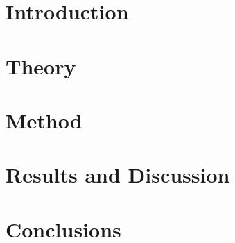 \mainmatter

\chapter{Introduction}
\label{cha:introduction}


\vspace{\fill}

\newpage

\chapter{Theory}
\label{cha:theory}


\vspace{\fill}

\newpage

\chapter{Method}
\label{cha:method}


\vspace{\fill}

\newpage

\chapter{Results and Discussion}
\label{cha:results_and_discussion}



%



%

\vspace{\fill}

\newpage

\chapter{Conclusions}
\label{cha:conclusions}


